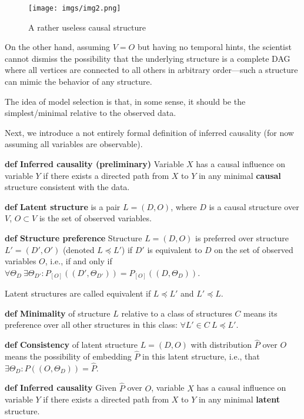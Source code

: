 \documentclass[fleqn]{article}
\def\define#1{\textbf{def} \textbf{#1}}
\numberwithin{equation}{section}
\numberwithin{theorem}{section}
\numberwithin{figure}{section}
\numberwithin{lemma}{section}
\numberwithin{corollary}{section}
\begin{document}
\begin{figure}[h]
	\begin{center}
		\texttt{[image: imgs/img2.png]}
	\end{center}
	\caption{A rather useless causal structure}
	\label{fig:useless_model}
\end{figure}

On the other hand, assuming $V=O$ but having no temporal hints, the scientist cannot dismiss the possibility that the underlying structure is a complete DAG where all vertices are connected to all others in arbitrary order—such a structure can mimic the behavior of any structure.

The idea of model selection is that, in some sense, it should be the simplest/minimal relative to the observed data.

Next, we introduce a not entirely formal definition of inferred causality (for now assuming all variables are observable).

\define{Inferred causality (preliminary)} Variable $X$ has a causal influence on variable $Y$ if there exists a directed path from $X$ to $Y$ in any minimal \textbf{causal} structure consistent with the data.

\define{Latent structure} is a pair $L = (D, O)$, where $D$ is a causal structure over $V$, $O \subset V$ is the set of observed variables.

\define{Structure preference} Structure $L = (D, O)$ is preferred over structure $L' = (D', O')$ (denoted $L \preceq L'$) if $D'$ is equivalent to $D$ on the set of observed variables $O$, i.e., if and only if $\forall \Theta_D \ \exists \Theta_{D'} : P_{[O]}((D', \Theta_{D'})) = P_{[O]}((D, \Theta_{D}))$.

Latent structures are called equivalent if $L \preceq L'$ and $L' \preceq L$.

\define{Minimality} of structure $L$ relative to a class of structures $C$ means its preference over all other structures in this class: $\forall L' \in C \ L \preceq L'$.

\define{Consistency} of latent structure $L = (D, O)$ with distribution $\hat P$ over $O$ means the possibility of embedding $\hat P$ in this latent structure, i.e., that $\exists \Theta_D : P((O, \Theta_D)) = \hat P$.

\define{Inferred causality} Given $\hat P$ over $O$, variable $X$ has a causal influence on variable $Y$ if there exists a directed path from $X$ to $Y$ in any minimal \textbf{latent} structure.
\end{document}
